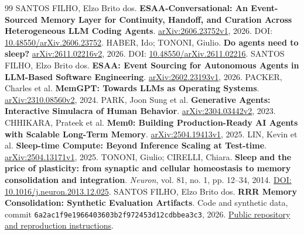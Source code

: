 \documentclass[11pt,a4paper]{article}
\begin{document}
\begin{thebibliography}{99}
 SANTOS FILHO, Elzo Brito dos. \textbf{ESAA-Conversational: An Event-Sourced Memory Layer for Continuity, Handoff, and Curation Across Heterogeneous LLM Coding Agents}. \href{https://arxiv.org/abs/2606.23752v1}{arXiv:2606.23752v1}, 2026. DOI: \href{https://doi.org/10.48550/arXiv.2606.23752}{10.48550/arXiv.2606.23752}.
 HABER, Ido; TONONI, Giulio. \textbf{Do agents need to sleep?} \href{https://arxiv.org/abs/2611.02216v2}{arXiv:2611.02216v2}, 2026. DOI: \href{https://doi.org/10.48550/arXiv.2611.02216}{10.48550/arXiv.2611.02216}.
 SANTOS FILHO, Elzo Brito dos. \textbf{ESAA: Event Sourcing for Autonomous Agents in LLM-Based Software Engineering}. \href{https://arxiv.org/abs/2602.23193v1}{arXiv:2602.23193v1}, 2026.
 PACKER, Charles et al. \textbf{MemGPT: Towards LLMs as Operating Systems}. \href{https://arxiv.org/abs/2310.08560v2}{arXiv:2310.08560v2}, 2024.
 PARK, Joon Sung et al. \textbf{Generative Agents: Interactive Simulacra of Human Behavior}. \href{https://arxiv.org/abs/2304.03442v2}{arXiv:2304.03442v2}, 2023.
 CHHIKARA, Prateek et al. \textbf{Mem0: Building Production-Ready AI Agents with Scalable Long-Term Memory}. \href{https://arxiv.org/abs/2504.19413v1}{arXiv:2504.19413v1}, 2025.
 LIN, Kevin et al. \textbf{Sleep-time Compute: Beyond Inference Scaling at Test-time}. \href{https://arxiv.org/abs/2504.13171v1}{arXiv:2504.13171v1}, 2025.
 TONONI, Giulio; CIRELLI, Chiara. \textbf{Sleep and the price of plasticity: from synaptic and cellular homeostasis to memory consolidation and integration}. \emph{Neuron}, vol. 81, no. 1, pp. 12--34, 2014. \href{https://doi.org/10.1016/j.neuron.2013.12.025}{DOI: 10.1016/j.neuron.2013.12.025}.
 SANTOS FILHO, Elzo Brito dos. \textbf{RRR Memory Consolidation: Synthetic Evaluation Artifacts}. Code and synthetic data, commit \texttt{6a2ac1f9e1\allowbreak{}966403603b\allowbreak{}2f972453d1\allowbreak{}2cdbbea3c3}, 2026. \href{https://github.com/elzobrito/conversation-esaa-rrr-artifacts/tree/6a2ac1f9e1966403603b2f972453d12cdbbea3c3}{Public repository and reproduction instructions}.
\end{thebibliography}
\end{document}
